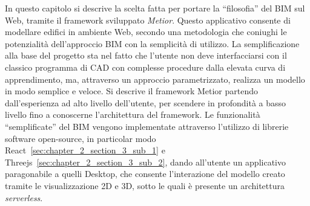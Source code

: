 In questo capitolo si descrive la scelta fatta per portare la ``filosofia'' del BIM sul Web, tramite il framework sviluppato
\emph{Metior}.
Questo applicativo consente di modellare edifici in ambiente Web, secondo una metodologia che coniughi le potenzialità
dell’approccio BIM con la semplicità di utilizzo.
La semplificazione alla base del progetto sta nel fatto che l'utente non deve interfacciarsi con il classico programma
di CAD con complesse procedure dalla elevata curva di apprendimento, ma, attraverso un approccio parametrizzato,
realizza un modello in modo semplice e veloce.
Si descrive il framework Metior partendo dall'esperienza ad alto livello dell'utente, per scendere in profondità
a basso livello fino a conoscerne l'architettura del framework.
Le funzionalità ``semplificate'' del BIM vengono implementate attraverso l'utilizzo di librerie software open-source,
in particolar modo React~\ref{sec:chapter_2_section_3_sub_1}
 e Threejs~\ref{sec:chapter_2_section_3_sub_2}, dando all'utente un applicativo paragonabile a quelli
Desktop, che consente l'interazione del modello creato tramite le visualizzazione 2D e 3D, sotto le quali
è presente un architettura \emph{serverless}.
\newpage
